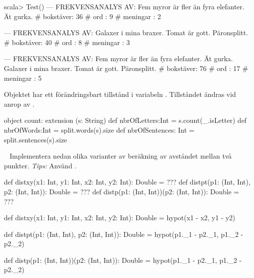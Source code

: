 \SubtaskSolved
\begin{REPLnonum}
scala> Test()
--- FREKVENSANALYS AV:
Fem     myror är fler än fyra elefanter. Ät gurka.
# bokstäver: 36
# ord      : 9
# meningar : 2

--- FREKVENSANALYS AV:
Galaxer i mina braxer. Tomat är gott. Päronsplitt.
# bokstäver: 40
# ord      : 8
# meningar : 3

--- FREKVENSANALYS AV:
Fem     myror är fler än fyra elefanter. Ät gurka. Galaxer i mina braxer. Tomat
är gott. Päronsplitt.
# bokstäver: 76
# ord      : 17
# meningar : 5
\end{REPLnonum}

\SubtaskSolved  Objektet  har ett förändringsbart tillstånd i variabeln . Tillståndet ändras vid anrop av .

\SubtaskSolved
\begin{Code}
  object count:
    extension (s: String)
      def nbrOfLetters:Int = s.count(_.isLetter)
      def nbrOfWords:Int = split.words(s).size
      def nbrOfSentences: Int = split.sentences(s).size  
\end{Code}


\QUESTEND



\QUESTBEGIN

\Task  \what~ Implementera nedan olika varianter av beräkning av avståndet mellan två punkter. \emph{Tips:} Använd .
\begin{Code}
def distxy(x1: Int, y1: Int, x2: Int, y2: Int): Double = ???
def distpt(p1: (Int, Int), p2: (Int, Int)):     Double = ???
def distp(p1: (Int, Int))(p2: (Int, Int)):      Double = ???

\end{Code}

\SOLUTION

\TaskSolved \what

\begin{Code}
def distxy(x1: Int, y1: Int, x2: Int, y2: Int): Double =
  hypot(x1 - x2, y1 - y2)

def distpt(p1: (Int, Int), p2: (Int, Int)): Double =
  hypot(p1._1 - p2._1, p1._2 - p2._2)

def distp(p1: (Int, Int))(p2: (Int, Int)): Double =
  hypot(p1._1 - p2._1, p1._2 - p2._2)
\end{Code}

\QUESTEND




